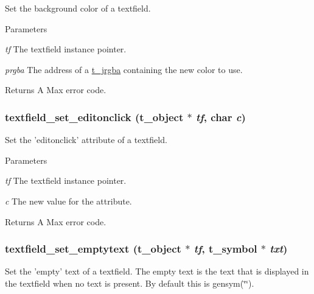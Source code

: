Set the background color of a textfield. 
\begin{DoxyParams}{Parameters}
\item[{\em tf}]The textfield instance pointer. \item[{\em prgba}]The address of a \hyperlink{structt__jrgba}{t\_\-jrgba} containing the new color to use. \end{DoxyParams}
\begin{DoxyReturn}{Returns}
A Max error code. 
\end{DoxyReturn}
\hypertarget{group__textfield_gad8e743fff1d74b2329a0da24a97ff1a5}{
\subsubsection[{textfield\_\-set\_\-editonclick}]{ textfield\_\-set\_\-editonclick ({\bf t\_\-object} $\ast$ {\em tf}, \/  char {\em c})}}
\label{group__textfield_gad8e743fff1d74b2329a0da24a97ff1a5}


Set the 'editonclick' attribute of a textfield. 
\begin{DoxyParams}{Parameters}
\item[{\em tf}]The textfield instance pointer. \item[{\em c}]The new value for the attribute. \end{DoxyParams}
\begin{DoxyReturn}{Returns}
A Max error code. 
\end{DoxyReturn}
\hypertarget{group__textfield_ga68ba343fcf9437717204b5a383cd10f7}{
\subsubsection[{textfield\_\-set\_\-emptytext}]{ textfield\_\-set\_\-emptytext ({\bf t\_\-object} $\ast$ {\em tf}, \/  {\bf t\_\-symbol} $\ast$ {\em txt})}}
\label{group__textfield_ga68ba343fcf9437717204b5a383cd10f7}


Set the 'empty' text of a textfield. The empty text is the text that is displayed in the textfield when no text is present. By default this is gensym(\char`\"{}\char`\"{}).


